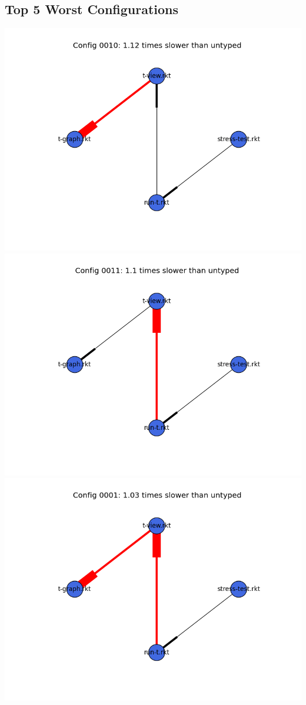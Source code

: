 \documentclass{article}
\begin{document}
\begin{itemize}
\subsection{Top 5 Worst Configurations}
\includegraphics[width=\textwidth]{mbta-ben-module-graph-0010.png}
\includegraphics[width=\textwidth]{mbta-ben-module-graph-0011.png}
\includegraphics[width=\textwidth]{mbta-ben-module-graph-0001.png}

\end{itemize}
\end{document}
